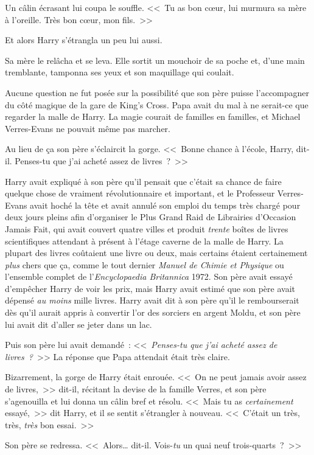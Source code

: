 Un câlin écrasant lui coupa le souffle. <<~Tu as bon cœur, lui murmura sa mère à l'oreille. Très bon cœur, mon fils.~>>

Et alors Harry s'étrangla un peu lui aussi.

Sa mère le relâcha et se leva. Elle sortit un mouchoir de sa poche et, d'une main tremblante, tamponna ses yeux et son maquillage qui coulait.

Aucune question ne fut posée sur la possibilité que son père puisse l'accompagner du côté magique de la gare de King's Cross. Papa avait du mal à ne serait-ce que regarder la malle de Harry. La magie courait de familles en familles, et Michael Verres-Evans ne pouvait même pas marcher.

Au lieu de ça son père s'éclaircit la gorge. <<~Bonne chance à l'école, Harry, dit-il. Penses-tu que j'ai acheté assez de livres~?~>>

Harry avait expliqué à son père qu'il pensait que c'était sa chance de faire quelque chose de vraiment révolutionnaire et important, et le Professeur Verres-Evans avait hoché la tête et avait annulé son emploi du temps très chargé pour deux jours pleins afin d'organiser le Plus Grand Raid de Librairies d'Occasion Jamais Fait, qui avait couvert quatre villes et produit \emph{trente} boîtes de livres scientifiques attendant à présent à l'étage caverne de la malle de Harry. La plupart des livres coûtaient une livre ou deux, mais certains étaient certainement \emph{plus} chers que ça, comme le tout dernier \emph{Manuel de Chimie et Physique} ou l'ensemble complet de l'\emph{Encyclopaedia Britannica} 1972. Son père avait essayé d'empêcher Harry de voir les prix, mais Harry avait estimé que son père avait dépensé \emph{au moins} mille livres. Harry avait dit à son père qu'il le rembourserait dès qu'il aurait appris à convertir l'or des sorciers en argent Moldu, et son père lui avait dit d'aller se jeter dans un lac.

Puis son père lui avait demandé~: <<~\emph{Penses-tu que j'ai acheté assez de livres~?}~>> La réponse que Papa attendait était très claire.

Bizarrement, la gorge de Harry était enrouée. <<~On ne peut jamais avoir assez de livres,~>> dit-il, récitant la devise de la famille Verres, et son père s'agenouilla et lui donna un câlin bref et résolu. <<~Mais tu as \emph{certainement} essayé,~>> dit Harry, et il se sentit s'étrangler à nouveau. <<~C'était un très, très, \emph{très} bon essai.~>>

Son père se redressa. <<~Alors… dit-il. Vois-\emph{tu} un quai neuf trois-quarts~?~>>

